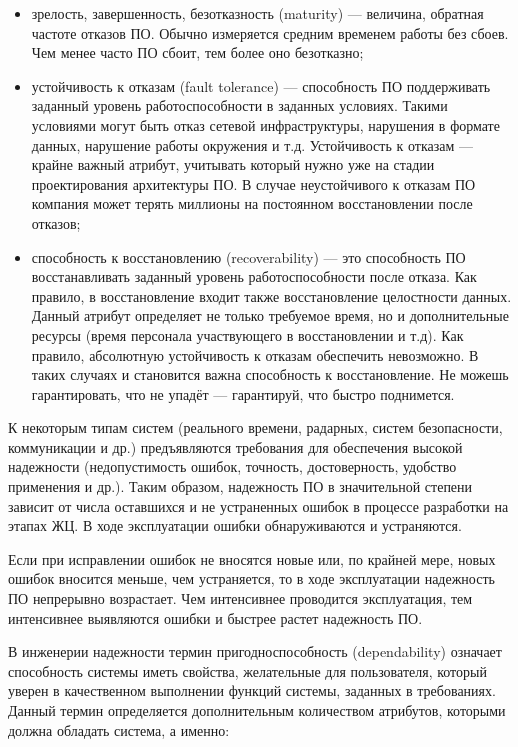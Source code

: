 \documentclass{../../text-style}
\begin{document}
\begin{itemize}
    \item зрелость, завершенность, безотказность (maturity) --- величина, обратная частоте отказов ПО. Обычно измеряется средним временем работы без сбоев. Чем менее часто ПО сбоит, тем более оно безотказно;
    \item устойчивость к отказам (fault tolerance) --- способность ПО поддерживать заданный уровень работоспособности в заданных условиях. Такими условиями могут быть отказ сетевой инфраструктуры, нарушения в формате данных, нарушение работы окружения и т.д. Устойчивость к отказам --- крайне важный атрибут, учитывать который нужно уже на стадии проектирования архитектуры ПО. В случае неустойчивого к отказам ПО компания может терять миллионы на постоянном восстановлении после отказов;
    \item способность к восстановлению (recoverability) --- это способность ПО восстанавливать заданный уровень работоспособности после отказа. Как правило, в восстановление входит также восстановление целостности данных. Данный атрибут определяет не только требуемое время, но и дополнительные ресурсы (время персонала участвующего в восстановлении и т.д). Как правило, абсолютную устойчивость к отказам обеспечить невозможно. В таких случаях и становится важна способность к восстановление. Не можешь гарантировать, что не упадёт --- гарантируй, что быстро поднимется.
\end{itemize}

К некоторым типам систем (реального времени, радарных, систем безопасности, коммуникации и др.) предъявляются требования для обеспечения высокой надежности (недопустимость ошибок, точность, достоверность, удобство применения и др.). Таким образом, надежность ПО в значительной степени зависит от числа оставшихся и не устраненных ошибок в процессе разработки на этапах ЖЦ. В ходе эксплуатации ошибки обнаруживаются и устраняются.

Если при исправлении ошибок не вносятся новые или, по крайней мере, новых ошибок вносится меньше, чем устраняется, то в ходе эксплуатации надежность ПО непрерывно возрастает. Чем интенсивнее проводится эксплуатация, тем интенсивнее выявляются ошибки и быстрее растет надежность ПО.

В инженерии надежности термин пригодноспособность (dependability) означает способность системы иметь свойства, желательные для пользователя, который уверен в качественном выполнении функций системы, заданных в требованиях. Данный термин определяется дополнительным количеством атрибутов, которыми должна обладать система, а именно:
\end{document}
